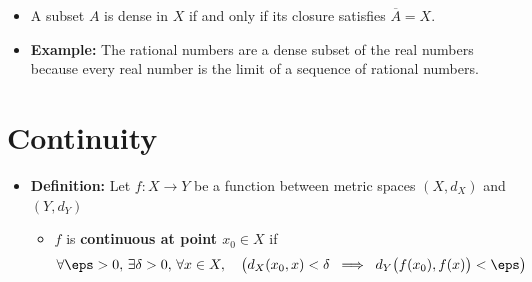 \documentclass[11pt,twoside]{report}
\newcommand{\Interior}[1]{\ensuremath{{#1}^{\circ}}}
\newcommand{\Closure}[1]{\ensuremath{\overline{#1}}}
\begin{document}
\begin{itemize}
\begin{itemize}
%
%


\item A subset $A$ is dense in $X$ if and only if its closure satisfies $\overline{A}=X$.


\item \textbf{Example:}
The rational numbers are a dense subset of the real numbers because every real number is the limit of a sequence of rational numbers.




\end{itemize}



\section{Continuity} 
\begin{itemize}


\item \textbf{Definition:} Let $f \colon X \to Y$ be a function between metric spaces $(X, d_X)$ and $(Y,d_Y)$

\begin{itemize}

\item  $f$ is \textbf{continuous at point  $x_0 \in X$} if %
\[
\forall \eps > 0,   \, \exists \delta > 0,  \,  \forall x \in X ,  \quad \big( d_X(x_0,x) < \delta \; \implies \;   d_Y\big( f(x_0) , f(x) \big)  < \eps \big)
\]


\end{itemize}
\end{itemize}
\end{itemize}
\end{document}
